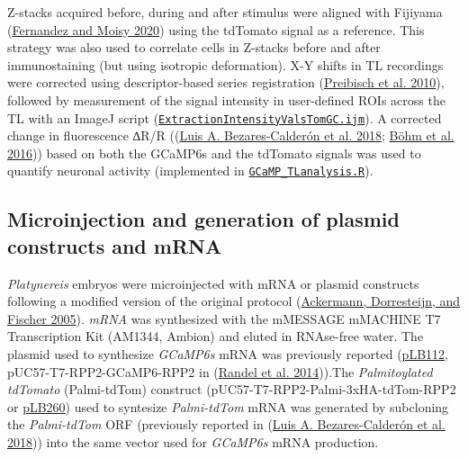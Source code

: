 \documentclass[
]{article}
\begin{document}
Z-stacks acquired before, during and after stimulus were aligned with
Fijiyama (\protect\hyperlink{ref-fernandez2020}{Fernandez and Moisy
2020}) using the tdTomato signal as a reference. This strategy was also
used to correlate cells in Z-stacks before and after immunostaining (but
using isotropic deformation). X-Y shifts in TL recordings were corrected
using descriptor-based series registration
(\protect\hyperlink{ref-preibisch2010}{Preibisch et al. 2010}), followed
by measurement of the signal intensity in user-defined ROIs across the
TL with an ImageJ script
(\href{https://github.com/JekelyLab/Bezares_et_al_2023_Pressure/blob/main/Code/CaImaging/ExtractionIntensityValsTomGC.ijm}{\texttt{ExtractionIntensityValsTomGC.ijm}}).
A corrected change in fluorescence ∆R/R
((\protect\hyperlink{ref-bezares-calderon2018}{Luis A. Bezares-Calderón
et al. 2018}; \protect\hyperlink{ref-buxf6hm2016}{Böhm et al. 2016}))
based on both the GCaMP6s and the tdTomato signals was used to quantify
neuronal activity (implemented in
\href{https://github.com/JekelyLab/Bezares_et_al_2023_Pressure/blob/main/Code/CaImaging/GCaMP_TLanalysis.R}{\texttt{GCaMP\_TLanalysis.R}}).

\hypertarget{microinjection-and-generation-of-plasmid-constructs-and-mrna}{%
\subsection{Microinjection and generation of plasmid constructs and
mRNA}\label{microinjection-and-generation-of-plasmid-constructs-and-mrna}}

\emph{Platynereis} embryos were microinjected with mRNA or plasmid
constructs following a modified version of the original protocol
(\protect\hyperlink{ref-ackermann2005}{Ackermann, Dorresteijn, and
Fischer 2005}). \emph{mRNA} was synthesized with the mMESSAGE mMACHINE
T7 Transcription Kit (AM1344, Ambion) and eluted in RNAse-free water.
The plasmid used to synthesize \emph{GCaMP6s} mRNA was previously
reported
(\href{https://benchling.com/jekelylab/f/lib_sdvdcR5P-plasmidsstock_lbdb_jekelylab/seq_HRSlbW3F-puc57-t7-rpp25utr-gcamp6sasci-agei_c1/edit}{pLB112},
pUC57-T7-RPP2-GCaMP6-RPP2 in (\protect\hyperlink{ref-randel2014}{Randel
et al. 2014})).The \emph{Palmitoylated tdTomato} (Palmi-tdTom) construct
(pUC57-T7-RPP2-Palmi-3xHA-tdTom-RPP2 or
\href{https://benchling.com/jekelylab/f/lib_sdvdcR5P-plasmidsstock_lbdb_jekelylab/seq_KpQNaGLw-plb260/edit}{pLB260})
used to syntesize \emph{Palmi-tdTom} mRNA was generated by subcloning
the \emph{Palmi-tdTom} ORF (previously reported in
(\protect\hyperlink{ref-bezares-calderon2018}{Luis A. Bezares-Calderón
et al. 2018})) into the same vector used for \emph{GCaMP6s} mRNA
production.
\end{document}

